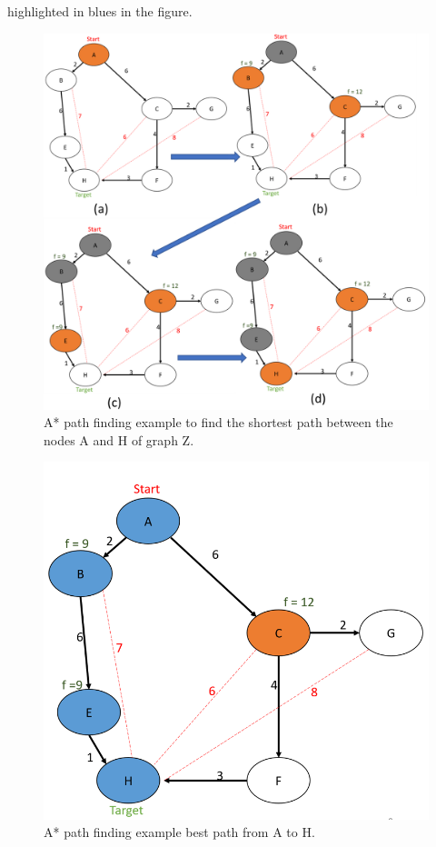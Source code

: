 highlighted in blues in the figure.

\begin{figure}[!ht]
    \centering
    \includegraphics[width = \linewidth]{figs/A8/A_STAR_EXAMPLE.png}
    \caption{A* path finding example to find the shortest path between the nodes A and H of graph Z.}
    \label{fig:A_STAR_EXAMPLE}
\end{figure}


\begin{figure}[!ht]
    \centering
    \includegraphics[width = 0.5\linewidth]{figs/A8/A_STAR_EXAMPLE_2.png}
    \caption{A* path finding example best path from A to H.}
    \label{fig:A_STAR_EXAMPLE_2}
\end{figure}


